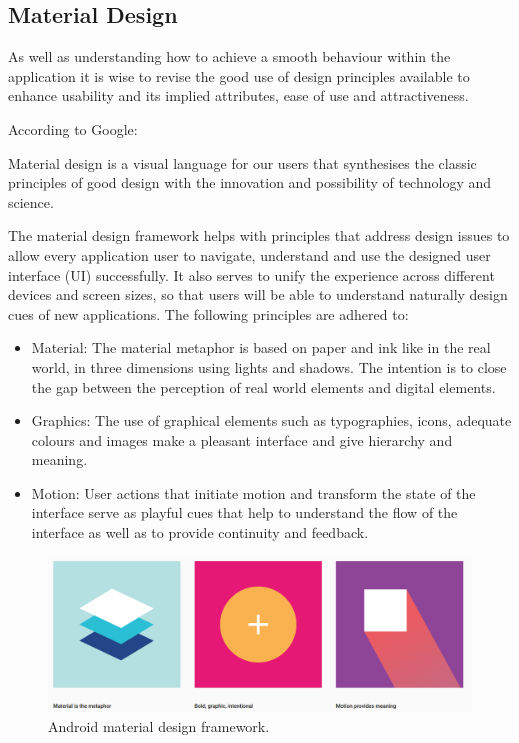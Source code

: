 \subsection{Material Design}
As well as understanding how to achieve a smooth behaviour within the application it is wise to revise the good use of design principles available to enhance usability and its implied attributes, ease of use and attractiveness.

According to Google: \begin{displayquote}Material design is a visual language for our users that synthesises the classic principles of good design with the innovation and possibility of technology and science. \end{displayquote} 

The material design framework helps with principles that address design issues to allow every application user to navigate, understand and use the designed user interface (UI) successfully. It also serves to unify the experience across different devices and screen sizes, so that users will be able to understand naturally design cues of new applications. The following principles are adhered to: 

\begin{itemize}
    \item Material: The material metaphor is based on paper and ink like in the real world, in three dimensions using lights and shadows. The intention is to close the gap between the perception of real world elements and digital elements. 
    \item Graphics: The use of graphical elements such as typographies, icons, adequate colours and images make a pleasant interface and give hierarchy and meaning. 
    \item Motion: User actions that initiate motion and transform the state of the interface serve as playful cues that help to understand the flow of the interface as well as to provide continuity and feedback. 
\end{itemize}


\begin{figure}[H]
\begin{adjustbox}{width=1\textwidth,center=\textwidth}
  \centering
  \includegraphics[scale=1]{images/material_google.png}
\end{adjustbox}
  \caption[Android material design framework]{Android material design framework.\footnotemark}
  \label{fig:android_material_design}
\end{figure}

